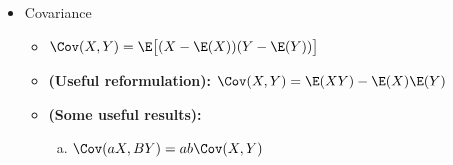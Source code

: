 \begin{itemize}
\begin{itemize}
\begin{proof}
\end{proof}

\begin{corollary} \textbf{(Rao-Blackwell Theorem.)} \(\Var(X) \geq \Var(\E(X \mid Y))\)

\end{corollary}

\begin{proof} Follows immediately from Theorem \ref{prob.ltv} by noting that since the variance is nonnegative, \(\E \big( \Var(X \mid Y) \big)  \geq 0\).

\end{proof}

\item \begin{proposition}\label{prob.const.var}If \(c \in \mathbb{R}\), then \(\Var(c) = 0\).
\end{proposition}

\item  For the conditional variance of one Gaussian random variable on another when the covariance or correlation between them is known, see Proposition \ref{prob.cond.bivar.norm.dist}. For the conditional variance of a set of Gaussian random variables on another set when the covariance matrix is known, see Proposition \ref{prob.cond.multivar.norm.dist}. 

\end{itemize}

\item Covariance

\begin{itemize}

\item \begin{definition} \( \Cov(X, Y ) = \E \big[ (X - \E(X))(Y - \E(Y))\big] \) \end{definition}

\item \begin{proposition} \textbf{(Useful reformulation):} \(\Cov(X, Y) = \E(XY) - \E(X)\E(Y)\) \end{proposition}

\item \begin{theorem} \textbf{(Some useful results):} 


\begin{enumerate}[(a)]

\item \(\Cov(aX, BY) = ab \Cov(X, Y)\)


\end{enumerate}
\end{theorem}
\end{itemize}
\end{itemize}
